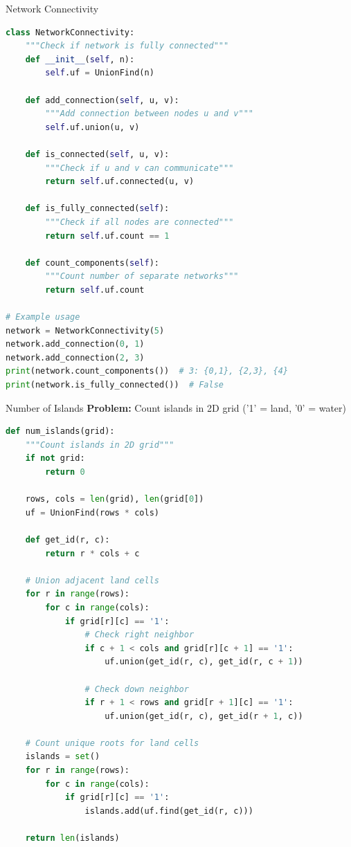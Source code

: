 \documentclass[aspectratio=169]{beamer}
\begin{document}
\begin{frame}[fragile]{Network Connectivity}
  \begin{lstlisting}[language=Python, basicstyle=\ttfamily\footnotesize]
class NetworkConnectivity:
    """Check if network is fully connected"""
    def __init__(self, n):
        self.uf = UnionFind(n)

    def add_connection(self, u, v):
        """Add connection between nodes u and v"""
        self.uf.union(u, v)

    def is_connected(self, u, v):
        """Check if u and v can communicate"""
        return self.uf.connected(u, v)

    def is_fully_connected(self):
        """Check if all nodes are connected"""
        return self.uf.count == 1

    def count_components(self):
        """Count number of separate networks"""
        return self.uf.count

# Example usage
network = NetworkConnectivity(5)
network.add_connection(0, 1)
network.add_connection(2, 3)
print(network.count_components())  # 3: {0,1}, {2,3}, {4}
print(network.is_fully_connected())  # False
  \end{lstlisting}
\end{frame}

\begin{frame}[fragile]{Number of Islands}
  \textbf{Problem:} Count islands in 2D grid ('1' = land, '0' = water)

  \begin{lstlisting}[language=Python, basicstyle=\ttfamily\footnotesize]
def num_islands(grid):
    """Count islands in 2D grid"""
    if not grid:
        return 0

    rows, cols = len(grid), len(grid[0])
    uf = UnionFind(rows * cols)

    def get_id(r, c):
        return r * cols + c

    # Union adjacent land cells
    for r in range(rows):
        for c in range(cols):
            if grid[r][c] == '1':
                # Check right neighbor
                if c + 1 < cols and grid[r][c + 1] == '1':
                    uf.union(get_id(r, c), get_id(r, c + 1))

                # Check down neighbor
                if r + 1 < rows and grid[r + 1][c] == '1':
                    uf.union(get_id(r, c), get_id(r + 1, c))

    # Count unique roots for land cells
    islands = set()
    for r in range(rows):
        for c in range(cols):
            if grid[r][c] == '1':
                islands.add(uf.find(get_id(r, c)))

    return len(islands)
  \end{lstlisting}
\end{frame}
\end{document}

